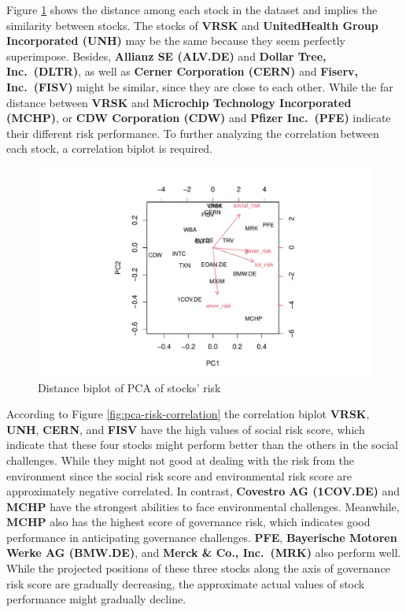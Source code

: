 \documentclass[11pt,a4paper,]{article}
\begin{document}
Figure \ref{fig:pca-risk-distance} shows the distance among each stock in the dataset and implies the similarity between stocks. The stocks of \textbf{VRSK} and \textbf{UnitedHealth Group Incorporated (UNH)} may be the same because they seem perfectly superimpose. Besides, \textbf{Allianz SE (ALV.DE)} and \textbf{Dollar Tree, Inc.~(DLTR)}, as well as \textbf{Cerner Corporation (CERN)} and \textbf{Fiserv, Inc.~(FISV)} might be similar, since they are close to each other. While the far distance between \textbf{VRSK} and \textbf{Microchip Technology Incorporated (MCHP)}, or \textbf{CDW Corporation (CDW)} and \textbf{Pfizer Inc.~(PFE)} indicate their different risk performance. To further analyzing the correlation between each stock, a correlation biplot is required.

\begin{figure}
\centering
\includegraphics{ass2_files/figure-latex/pca-risk-distance-1.pdf}
\caption{\label{fig:pca-risk-distance}Distance biplot of PCA of stocks' risk}
\end{figure}

According to Figure \ref{fig:pca-risk-correlation} the correlation biplot \textbf{VRSK}, \textbf{UNH}, \textbf{CERN}, and \textbf{FISV} have the high values of social risk score, which indicate that these four stocks might perform better than the others in the social challenges. While they might not good at dealing with the risk from the environment since the social risk score and environmental risk score are approximately negative correlated. In contrast, \textbf{Covestro AG (1COV.DE)} and \textbf{MCHP} have the strongest abilities to face environmental challenges. Meanwhile, \textbf{MCHP} also has the highest score of governance risk, which indicates good performance in anticipating governance challenges. \textbf{PFE}, \textbf{Bayerische Motoren Werke AG (BMW.DE)}, and \textbf{Merck \& Co., Inc.~(MRK)} also perform well. While the projected positions of these three stocks along the axis of governance risk score are gradually decreasing, the approximate actual values of stock performance might gradually decline.
\end{document}
